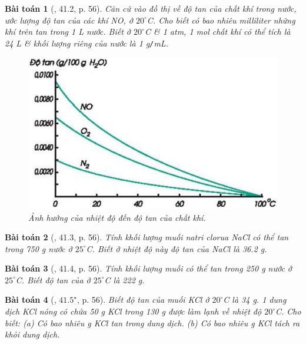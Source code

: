 \documentclass{article}
\newtheorem{baitoan}{Bài toán}
\begin{document}
\begin{baitoan}[\cite{SBT_Hoa_Hoc_8}, 41.2, p. 56]
	Căn cứ vào đồ thị về độ tan của chất khí trong nước, ước lượng độ tan của các khí \emph{NO, } ở $20^\circ$\emph{C}. Cho biết có bao nhiêu milliliter những khí trên tan trong \emph{1 L} nước. Biết ở $20^\circ$\emph{C} \& \emph{1 atm, 1 mol} chất khí có thể tích là \emph{24 L} \& khối lượng riêng của nước là \emph{1 g\texttt{/}mL}.	
	\begin{figure}[H]
		\centering
		\includegraphics[scale=0.3]{nhiet_do_do_tan_chat_khi}
		\caption{Ảnh hưởng của nhiệt độ đến độ tan của chất khí.}
		\label{fig:nhiet_do_do_tan_chat_khi}
	\end{figure}
\end{baitoan}

\begin{baitoan}[\cite{SBT_Hoa_Hoc_8}, 41.3, p. 56]
	Tính khối lượng muối natri clorua \emph{NaCl} có thể tan trong \emph{750 g} nước ở $25^\circ$\emph{C}. Biết ở nhiệt độ này độ tan của \emph{NaCl} là \emph{36.2 g}.
\end{baitoan}

\begin{baitoan}[\cite{SBT_Hoa_Hoc_8}, 41.4, p. 56]
	Tính khối lượng muối \emph{} có thể tan trong \emph{250 g} nước ở $25^\circ$\emph{C}. Biết độ tan của \emph{} ở $25^\circ$\emph{C} là \emph{222 g}.
\end{baitoan}

\begin{baitoan}[\cite{SBT_Hoa_Hoc_8}, $41.5^\star$, p. 56]
	Biết độ tan của muối \emph{KCl} ở 	$20^\circ$\emph{C} là \emph{34 g}. 1 dung dịch \emph{KCl} nóng có chứa \emph{50 g KCl} trong \emph{130 g } được làm lạnh về nhiệt độ $20^\circ$\emph{C}. Cho biết: (a) Có bao nhiêu \emph{g KCl} tan trong dung dịch. (b) Có bao nhiêu \emph{g KCl} tách ra khỏi dung dịch.
\end{baitoan}
\end{document}
